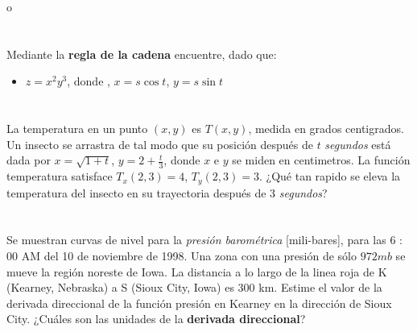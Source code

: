o\documentclass[12pt]{article}
\begin{document}
\section{}

Mediante la \textbf{regla de la cadena} encuentre, dado que:

\begin{itemize}[format=\textbf]

\item $z=x^2y^3$, donde , $x=s\cos{t}$, $y=s\sin{t}$

\end{itemize}

\section{}

La temperatura en un punto $(x, y)$ es $T(x, y)$, medida en grados centigrados. Un insecto se arrastra de tal modo que su posición después de $t$ \textit{segundos} está dada por $x =
\sqrt{1 + t}$, $y = 2 + \frac{t}{3}$, donde $x$ e $y$ se miden en centimetros. La función temperatura satisface $T_x(2, 3) = 4$, $T_y(2, 3) = 3$.
¿Qué tan rapido se eleva la temperatura del insecto en su trayectoria después de 3 \textit{segundos}?

\section{}

Se muestran curvas de nivel para la \textit{presión barométrica} [mili-bares], para las 6 : 00 AM del 10 de noviembre de 1998. Una zona con una presión de
sólo $972 mb$ se mueve la región noreste de Iowa. La distancia a lo largo de la linea roja de K (Kearney, Nebraska) a S (Sioux City, Iowa) es 300 km. Estime el valor de la derivada direccional de la función presión en Kearney en la dirección de Sioux City. ¿Cuáles son las unidades de la \textbf{derivada
direccional}?

\section{}
\end{document}
